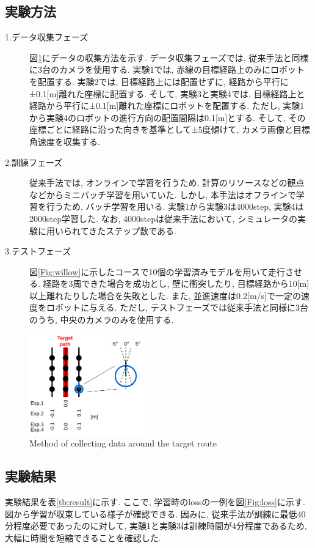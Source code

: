 \documentclass{ujarticle}
\begin{document}
\newpage
\subsection{実験方法}
\begin{description}
		\item[1.データ収集フェーズ]図\ref{Fig:collect-data}にデータの収集方法を示す. データ収集フェーズでは, 従来手法と同様に3台のカメラを使用する. 実験1では, 赤線の目標経路上のみにロボットを配置する. 実験2では, 目標経路上には配置せずに, 経路から平行に±0.1[m]離れた座標に配置する. そして, 実験3と実験4では, 目標経路上と経路から平行に±0.1[m]離れた座標にロボットを配置する. ただし, 実験1から実験4のロボットの進行方向の配置間隔は0.1[m]とする. そして, その座標ごとに経路に沿った向きを基準として±5度傾けて, カメラ画像と目標角速度を収集する. 
		\item[2.訓練フェーズ]従来手法では, オンラインで学習を行うため, 計算のリソースなどの観点などからミニバッチ学習を用いていた. しかし, 本手法はオフラインで学習を行うため, バッチ学習を用いる. 実験1から実験3は4000step, 実験4は2000step学習した. なお, 4000stepは従来手法において, シミュレータの実験に用いられてきたステップ数である. 
		\item[3.テストフェーズ]図\ref{Fig:willow}に示したコースで10個の学習済みモデルを用いて走行させる. 経路を3周できた場合を成功とし, 壁に衝突したり, 目標経路から10[m]以上離れたりした場合を失敗とした. また, 並進速度は0.2[m/s]で一定の速度をロボットに与える. ただし, テストフェーズでは従来手法と同様に3台のうち, 中央のカメラのみを使用する. 
\end{description}

\begin{figure}[h]
		\centering
		\includegraphics[width=0.45\textwidth]{img/collect2.png}
		\caption{Method of collecting data around the target route}
		\label{Fig:collect-data}
\end{figure}

\subsection{実験結果}実験結果を表\ref{tb:result}に示す. ここで, 学習時のlossの一例を図\ref{Fig:loss}に示す. 図から学習が収束している様子が確認できる. 因みに, 従来手法が訓練に最低40分程度必要であったのに対して, 実験1と実験3は訓練時間が4分程度であるため, 大幅に時間を短縮できることを確認した. 
\end{document}
